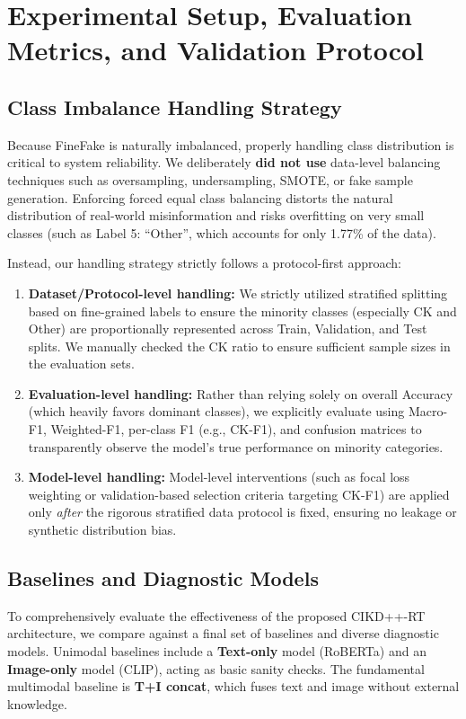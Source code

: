 \section{Experimental Setup, Evaluation Metrics, and Validation Protocol}

\subsection{Class Imbalance Handling Strategy}
Because FineFake is naturally imbalanced, properly handling class distribution is critical to system reliability. We deliberately \textbf{did not use} data-level balancing techniques such as oversampling, undersampling, SMOTE, or fake sample generation. Enforcing forced equal class balancing distorts the natural distribution of real-world misinformation and risks overfitting on very small classes (such as Label 5: ``Other'', which accounts for only 1.77\% of the data).

Instead, our handling strategy strictly follows a protocol-first approach:
\begin{enumerate}
    \item \textbf{Dataset/Protocol-level handling:} We strictly utilized stratified splitting based on fine-grained labels to ensure the minority classes (especially CK and Other) are proportionally represented across Train, Validation, and Test splits. We manually checked the CK ratio to ensure sufficient sample sizes in the evaluation sets.
    \item \textbf{Evaluation-level handling:} Rather than relying solely on overall Accuracy (which heavily favors dominant classes), we explicitly evaluate using Macro-F1, Weighted-F1, per-class F1 (e.g., CK-F1), and confusion matrices to transparently observe the model's true performance on minority categories.
    \item \textbf{Model-level handling:} Model-level interventions (such as focal loss weighting or validation-based selection criteria targeting CK-F1) are applied only \textit{after} the rigorous stratified data protocol is fixed, ensuring no leakage or synthetic distribution bias.
\end{enumerate}

\subsection{Baselines and Diagnostic Models}
To comprehensively evaluate the effectiveness of the proposed CIKD++-RT architecture, we compare against a final set of baselines and diverse diagnostic models. Unimodal baselines include a \textbf{Text-only} model (RoBERTa) and an \textbf{Image-only} model (CLIP), acting as basic sanity checks. The fundamental multimodal baseline is \textbf{T+I concat}, which fuses text and image without external knowledge.

